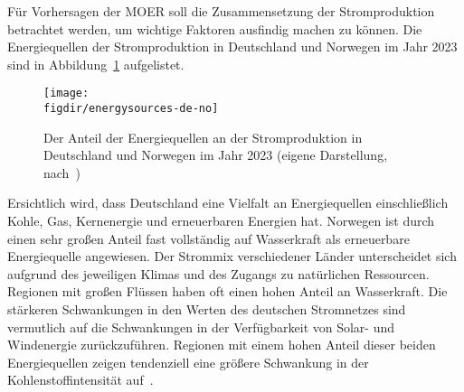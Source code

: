 Für Vorhersagen der \ac{MOER} soll die Zusammensetzung der Stromproduktion betrachtet werden, um wichtige Faktoren ausfindig machen zu können.
Die Energiequellen der Stromproduktion in Deutschland und Norwegen im Jahr 2023 sind in Abbildung~\ref{FIG:energysources-de-no} aufgelistet.
\begin{figure}
 \caption[Energiequellen der Strompoduktion von Deutschland und Norwegen 2023]{Der Anteil der Energiequellen an der Stromproduktion in Deutschland und Norwegen im Jahr 2023 (eigene Darstellung, nach~\cite{ElectricityMaps.20240305T20:54:29.000Z})}
 {\texttt{[image: \\figdir/energysources-de-no]}}
 \label{FIG:energysources-de-no}
\end{figure}
Ersichtlich wird, dass Deutschland eine Vielfalt an Energiequellen einschließlich Kohle, Gas, Kernenergie und erneuerbaren Energien hat.
Norwegen ist durch einen sehr großen Anteil fast vollständig auf Wasserkraft als erneuerbare Energiequelle angewiesen.
Der Strommix verschiedener Länder unterscheidet sich aufgrund des jeweiligen Klimas und des Zugangs zu natürlichen Ressourcen.
Regionen mit großen Flüssen haben oft einen hohen Anteil an Wasserkraft.
Die stärkeren Schwankungen in den Werten des deutschen Stromnetzes sind vermutlich auf die Schwankungen in der Verfügbarkeit von Solar- und Windenergie zurückzuführen.
Regionen mit einem hohen Anteil dieser beiden Energiequellen zeigen tendenziell eine größere Schwankung in der Kohlenstoffintensität auf~\cite{Sukprasert.2023}.

